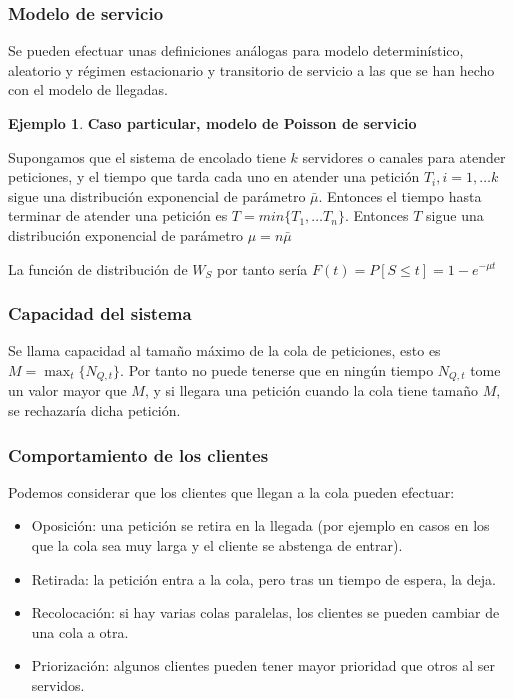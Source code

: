 \documentclass[a4paper,10pt]{scrartcl}
\theoremstyle{definition}
\newtheorem*{eg}{Ejemplo}
\numberwithin{equation}{section}
\begin{document}
\subsubsection{Modelo de servicio}

Se pueden efectuar unas definiciones análogas para modelo determinístico, aleatorio y régimen estacionario y transitorio
de servicio a las que se han hecho con el modelo de llegadas.

\begin{eg} \textbf{Caso particular, modelo de Poisson de servicio}

Supongamos que el sistema de encolado tiene $k$ servidores o canales para atender peticiones, y el tiempo que 
tarda cada uno en atender una petición $T_i, i=1,\ldots k$ sigue una distribución exponencial de parámetro $\bar{\mu}$.
Entonces el tiempo hasta terminar de atender una petición es $T = min\{T_1, \ldots T_n\}$. Entonces $T$ sigue
una distribución exponencial de parámetro $\mu = n \bar{\mu}$

La función de distribución de $W_S$ por tanto sería $F(t) = P[S\le t] = 1 - e^{-\mu t}$
\end{eg}

\subsubsection{Capacidad del sistema}
Se llama capacidad al tamaño máximo de la cola de peticiones, esto es $M = \max_t \{N_{Q,t}\}$. Por tanto no puede
tenerse que en ningún tiempo $N_{Q,t}$ tome un valor mayor que $M$, y si llegara una petición cuando la cola tiene
tamaño $M$, se rechazaría dicha petición.

\subsubsection{Comportamiento de los clientes}
Podemos considerar que los clientes que llegan a la cola pueden efectuar:

\begin{itemize}
  \item Oposición: una petición se retira en la llegada (por ejemplo en casos en los que la cola sea muy larga
  y el cliente se abstenga de entrar).
  \item Retirada: la petición entra a la cola, pero tras un tiempo de espera, la deja.
  \item Recolocación: si hay varias colas paralelas, los clientes se pueden cambiar de una cola a otra.
  \item Priorización: algunos clientes pueden tener mayor prioridad que otros al ser servidos.
\end{itemize}
\end{document}
